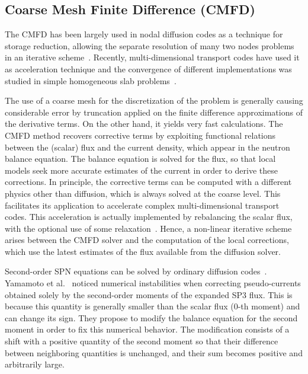 \documentclass[letterpaper]{physor2020}
\begin{document}
\subsection{Coarse Mesh Finite Difference (CMFD)} 
\label{sec:CMFD-intro}

The CMFD has been largely used in nodal diffusion codes as a technique for storage reduction, allowing the separate resolution of many two nodes problems in an iterative scheme~\cite{Smith-1983,Lawrence-1986}. Recently, multi-dimensional transport codes have used it as acceleration technique and the convergence of different implementations was studied in simple homogeneous slab problems~\cite{Jarrett-2016,Shen-2019}.

The use of a coarse mesh for the discretization of the problem is generally causing considerable error by truncation applied on the finite difference approximations of the derivative terms. On the other hand, it yields very fast calculations. The CMFD method recovers corrective terms by exploiting functional relations between the (scalar) flux and the current density, which appear in the neutron balance equation. The balance equation is solved for the flux, so that local models seek more accurate estimates of the current in order to derive these corrections. In principle, the corrective terms can be computed with a different physics other than diffusion, which is always solved at the coarse level. This facilitates its application to accelerate complex multi-dimensional transport codes. This acceleration is actually implemented by rebalancing the scalar flux, with the optional use of some relaxation~\cite{Park-2017}. Hence, a non-linear iterative scheme arises between the CMFD solver and the computation of the local corrections, which use the latest estimates of the flux available from the diffusion solver.

Second-order SPN equations can be solved by ordinary diffusion codes~\cite{Larsen-1993}. Yamamoto et al.~\cite{Yamamoto-2016} noticed numerical instabilities when correcting pseudo-currents obtained solely by the second-order moments of the expanded SP3 flux. This is because this quantity is generally smaller than the scalar flux (0-th moment) and can change its sign. They propose to modify the balance equation for the second moment in order to fix this numerical behavior. The modification consists of a shift with a positive quantity of the second moment so that their difference between neighboring quantities is unchanged, and their sum becomes positive and arbitrarily large.
\end{document}
